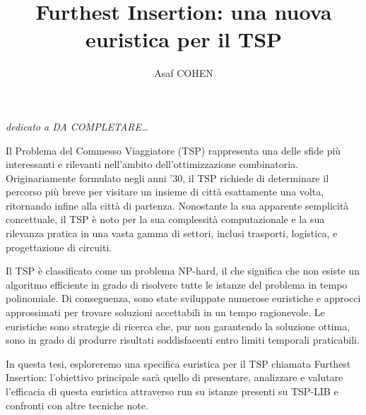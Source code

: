 \documentclass[a4paper,12pt]{report}
\begin{document}
\title{Furthest Insertion: una nuova euristica per il TSP}
\author{Asaf COHEN}
%
% 
%

\beforepreface

\clearpage
\null
\thispagestyle{empty}
\clearpage

        {\hfill \Large {\sl dedicato a DA COMPLETARE\dots}}
% 
%

\clearpage
\null
\thispagestyle{empty}
\clearpage

Il Problema del Commesso Viaggiatore (TSP) rappresenta una delle sfide più interessanti e rilevanti nell'ambito dell'ottimizzazione combinatoria. Originariamente formulato negli anni '30, il TSP richiede di determinare il percorso più breve per visitare un insieme di città esattamente una volta, ritornando infine alla città di partenza. Nonostante la sua apparente semplicità concettuale, il TSP è noto per la sua complessità computazionale e la sua rilevanza pratica in una vasta gamma di settori, inclusi trasporti,  logistica, e progettazione di circuiti.

Il TSP è classificato come un problema NP-hard, il che significa che non esiste un algoritmo efficiente in grado di risolvere tutte le istanze del problema in tempo polinomiale. Di conseguenza, sono state sviluppate numerose euristiche e approcci approssimati per trovare soluzioni accettabili in un tempo ragionevole. Le euristiche sono strategie di ricerca che, pur non garantendo la soluzione ottima, sono in grado di produrre risultati soddisfacenti entro limiti temporali praticabili.

In questa tesi, esploreremo una specifica euristica per il TSP chiamata Furthest Insertion: l'obiettivo principale sarà quello di presentare, analizzare e valutare l'efficacia di questa euristica attraverso run su istanze presenti su TSP-LIB e confronti con altre tecniche note.
\end{document}
